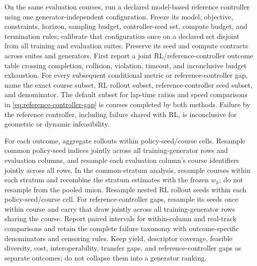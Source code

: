 On the same evaluation courses, run a declared model-based reference controller using
one generator-independent configuration. Freeze its model, objective, constraints,
horizon, sampling budget, controller-seed set, compute budget, and termination rules;
calibrate that configuration once on a declared set disjoint from all training and
evaluation suites. Preserve its seed and compute contracts across suites and
generators. First report a joint RL/reference-controller outcome table crossing
completion, collision, violation, timeout, and inconclusive budget exhaustion. For
every subsequent conditional metric or reference-controller gap, name the exact
course subset, RL rollout subset, reference-controller seed subset, and denominator.
The default subset for lap-time ratios and speed comparisons in
\cref{eq:reference-controller-gap} is courses completed by both methods. Failure by
the reference controller, including failure shared with RL, is inconclusive for
geometric or dynamic infeasibility.

For each outcome, aggregate rollouts within policy-seed/course cells. Resample common
policy-seed indices jointly across all training-generator rows and evaluation columns,
and resample each evaluation column's course identifiers jointly across all rows. In
the common-stratum analysis, resample courses within each stratum and recombine the
stratum estimates with the frozen $w_h$; do not resample from the pooled union. Resample
nested RL rollout seeds within each policy-seed/course cell. For reference-controller
gaps, resample its seeds once within course and carry that draw jointly across all
training-generator rows sharing the course. Report paired intervals for within-column
and real-track comparisons and retain the complete failure taxonomy with
outcome-specific denominators and censoring rules. Keep yield, descriptor coverage,
feasible diversity, cost, interoperability, transfer gaps, and reference-controller
gaps as separate outcomes; do not collapse them into a generator ranking.

